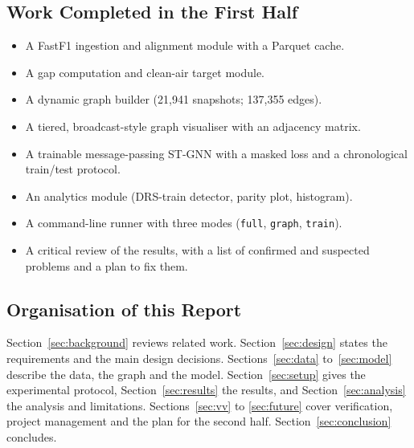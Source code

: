 \documentclass[11pt,a4paper]{article}
\begin{document}
\subsection{Work Completed in the First Half}
\begin{itemize}[leftmargin=*]
  \item A FastF1 ingestion and alignment module with a Parquet cache.
  \item A gap computation and clean-air target module.
  \item A dynamic graph builder (21{,}941 snapshots; 137{,}355 edges).
  \item A tiered, broadcast-style graph visualiser with an adjacency matrix.
  \item A trainable message-passing ST-GNN with a masked loss and a
        chronological train/test protocol.
  \item An analytics module (DRS-train detector, parity plot, histogram).
  \item A command-line runner with three modes (\texttt{full}, \texttt{graph},
        \texttt{train}).
  \item A critical review of the results, with a list of confirmed and
        suspected problems and a plan to fix them.
\end{itemize}

\subsection{Organisation of this Report}
Section~\ref{sec:background} reviews related work. Section~\ref{sec:design}
states the requirements and the main design decisions. Sections~\ref{sec:data}
to~\ref{sec:model} describe the data, the graph and the model. Section~\ref{sec:setup}
gives the experimental protocol, Section~\ref{sec:results} the results, and
Section~\ref{sec:analysis} the analysis and limitations. Sections~\ref{sec:vv} to
\ref{sec:future} cover verification, project management and the plan for
the second half. Section~\ref{sec:conclusion} concludes.
\end{document}
